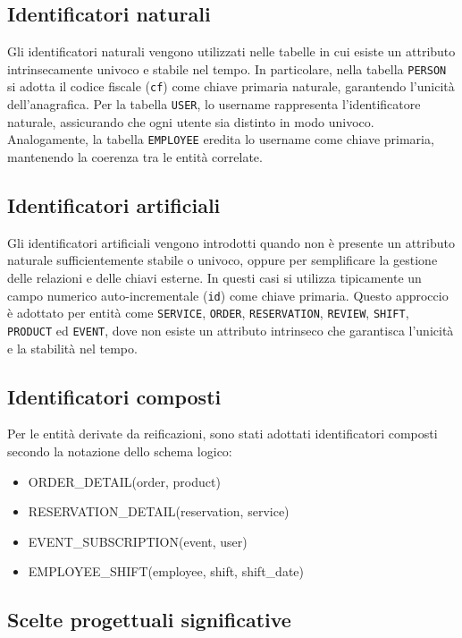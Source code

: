 \documentclass[a4paper,12pt]{report}
\begin{document}
\subsection*{Identificatori naturali}
Gli identificatori naturali vengono utilizzati nelle tabelle in cui
esiste un attributo intrinsecamente univoco e stabile nel tempo. In
particolare, nella tabella \texttt{PERSON} si adotta il codice
fiscale (\texttt{cf}) come chiave primaria naturale, garantendo
l'unicità dell'anagrafica. Per la tabella \texttt{USER}, lo username
rappresenta l'identificatore naturale, assicurando che ogni utente
sia distinto in modo univoco. Analogamente, la tabella
\texttt{EMPLOYEE} eredita lo username come chiave primaria,
mantenendo la coerenza tra le entità correlate.

\subsection*{Identificatori artificiali}
Gli identificatori artificiali vengono introdotti quando non è
presente un attributo naturale sufficientemente stabile o univoco,
oppure per semplificare la gestione delle relazioni e delle chiavi
esterne. In questi casi si utilizza tipicamente un campo numerico
auto-incrementale (\texttt{id}) come chiave primaria. Questo
approccio è adottato per entità come \texttt{SERVICE}, \texttt{ORDER},
\texttt{RESERVATION}, \texttt{REVIEW}, \texttt{SHIFT}, \texttt{PRODUCT}
ed \texttt{EVENT}, dove non esiste un attributo intrinseco che garantisca
l'unicità e la stabilità nel tempo.

\subsection*{Identificatori composti}
Per le entità derivate da reificazioni, sono stati adottati
identificatori composti secondo la notazione dello schema logico:

\begin{itemize}
  \item ORDER\_DETAIL(order, product)
  \item RESERVATION\_DETAIL(reservation, service)
  \item EVENT\_SUBSCRIPTION(event, user)
  \item EMPLOYEE\_SHIFT(employee, shift, shift\_date)
\end{itemize}

\subsection{Scelte progettuali significative}
\end{document}
